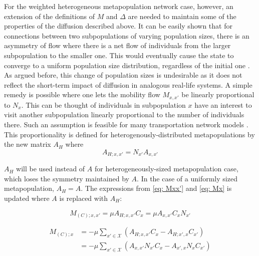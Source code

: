 For the weighted heterogeneous metapopulation network case, however, an extension of the definitions of $M$ and $\Delta$ are needed to maintain some of the properties of the diffusion described above. It can be easily shown that for connections between two subpopulations of varying population sizes, there is an asymmetry of flow where there is a net flow of individuals from the larger subpopulation to the smaller one. This would eventually cause the state to converge to a uniform population size distribution, regardless of the initial one \cite{Kuehn2024}. As argued before, this change of population sizes is undesirable as it does not reflect the short-term impact of diffusion in analogous real-life systems. A simple remedy is possible where one lets the mobility flow $M_{x,x'}$ be linearly proportional to $N_x$. This can be thought of individuals in subpopulation $x$ have an interest to visit another subpopulation linearly proportional to the number of individuals there. Such an assumption is feasible for many transportation network models \cite{colizza2006role}\cite{bajardi2011human}. This proportionality is defined for heterogenously-distributed metapopulations by the new matrix $A_{H}$ where 
\begin{equation}
    A_{H;x,x'} = N_{x'} A_{x,x'}
    \label{eq: AH}
\end{equation}

$A_H$ will be used instead of $A$ for heterogeneously-sized metapopulation case, which loses the symmetry maintained by $A$. In the case of a uniformly sized metapopulation, $A_H = A$. The expressions from \ref{eq: Mxx'} and \ref{eq: Mx} is updated where $A$ is replaced with $A_H$:

\begin{equation}
    M_{(C);x,x'} = \mu  A_{H;x,x'} C_{x} = \mu  A_{x,x'} C_{x} N_{x'}
    \label{eq: MHxx'}
\end{equation}

\begin{equation}
    \begin{aligned}
    M_{(C);x}   &=  -\mu \sum_{x' \in \mathcal{X}} (A_{H;x,x'} C_{x} -  A_{H;x',x} C_{x'})\\
                &= -\mu \sum_{x' \in \mathcal{X}} (A_{x,x'} N_{x'} C_{x} -  A_{x',x} N_{x} C_{x'})
    \end{aligned}
    \label{eq: MHx}
\end{equation}

